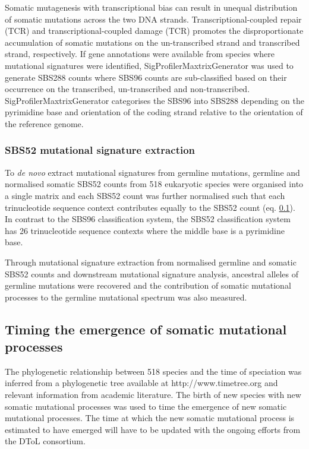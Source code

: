 Somatic mutagenesis with transcriptional bias can result in unequal distribution of somatic mutations across the two DNA strands. Transcriptional-coupled repair (TCR) \cite{} and transcriptional-coupled damage (TCR) \cite{} promotes the disproportionate accumulation of somatic mutations on the un-transcribed strand and transcribed strand, respectively. If gene annotations were available from species where mutational signatures were identified, SigProfilerMaxtrixGenerator \cite{} was used to generate SBS288 counts where SBS96 counts are sub-classified based on their occurrence on the transcribed, un-transcribed and non-transcribed. SigProfilerMaxtrixGenerator categorises the SBS96 into SBS288 depending on the pyrimidine base and orientation of the coding strand relative to the orientation of the reference genome.  

\subsubsection{SBS52 mutational signature extraction}

To \textit{de novo} extract mutational signatures from germline mutations, germline and normalised somatic SBS52 counts from 518 eukaryotic species were organised into a single matrix and each SBS52 count was further normalised such that each trinucleotide sequence context contributes equally to the SBS52 count (eq. \ref{}). In contrast to the SBS96 classification system, the SBS52 classification system has 26 trinucleotide sequence contexts where the middle base is a pyrimidine base. 

Through mutational signature extraction from normalised germline and somatic SBS52 counts and downstream mutational signature analysis, ancestral alleles of germline mutations were recovered and the contribution of somatic mutational processes to the germline mutational spectrum was also measured. 

\subsection{Timing the emergence of somatic mutational processes}

The phylogenetic relationship between 518 species and the time of speciation was inferred from a phylogenetic tree available at http://www.timetree.org and relevant information from academic literature. The birth of new species with new somatic mutational processes was used to time the emergence of new somatic mutational processes. The time at which the new somatic mutational process is estimated to have emerged will have to be updated with the ongoing efforts from the DToL consortium.  

